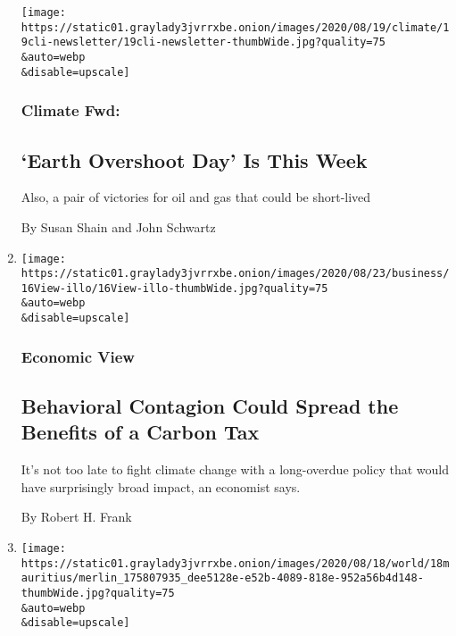 \begin{enumerate}
  \texttt{[image: https://static01.graylady3jvrrxbe.onion/images/2020/08/19/climate/19cli-newsletter/19cli-newsletter-thumbWide.jpg?quality=75\\\&auto=webp\\\&disable=upscale]}

  \hypertarget{climate-fwd}{%
  \subsubsection{Climate Fwd:}\label{climate-fwd}}

  \hypertarget{earth-overshoot-day-is-this-week}{%
  \subsection{`Earth Overshoot Day' Is This
  Week}\label{earth-overshoot-day-is-this-week}}

  Also, a pair of victories for oil and gas that could be short-lived

  By Susan Shain and John Schwartz
\item
  \href{/2020/08/19/business/behavioral-contagion-carbon-tax.html}{}

  \texttt{[image: https://static01.graylady3jvrrxbe.onion/images/2020/08/23/business/16View-illo/16View-illo-thumbWide.jpg?quality=75\\\&auto=webp\\\&disable=upscale]}

  \hypertarget{economic-view}{%
  \subsubsection{Economic View}\label{economic-view}}

  \hypertarget{behavioral-contagion-could-spread-the-benefits-of-a-carbon-tax}{%
  \subsection{Behavioral Contagion Could Spread the Benefits of a Carbon
  Tax}\label{behavioral-contagion-could-spread-the-benefits-of-a-carbon-tax}}

  It's not too late to fight climate change with a long-overdue policy
  that would have surprisingly broad impact, an economist says.

  By Robert H. Frank
\item
  \href{/2020/08/18/world/africa/captain-mauritius-oil-spill-arrested.html}{}

  \texttt{[image: https://static01.graylady3jvrrxbe.onion/images/2020/08/18/world/18mauritius/merlin\_175807935\_dee5128e-e52b-4089-818e-952a56b4d148-thumbWide.jpg?quality=75\\\&auto=webp\\\&disable=upscale]}


\end{enumerate}
